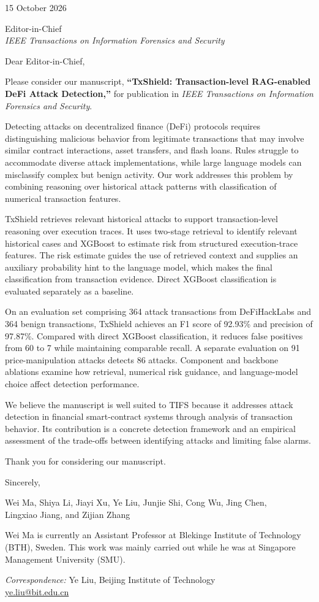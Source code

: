 \documentclass[11pt,letterpaper]{article}
\begin{document}
\begin{flushright}
15 October 2026
\end{flushright}
Editor-in-Chief\\
\textit{IEEE Transactions on Information Forensics and Security}

Dear Editor-in-Chief,

Please consider our manuscript, \textbf{``TxShield: Transaction-level RAG-enabled DeFi Attack Detection,''} for publication in \textit{IEEE Transactions on Information Forensics and Security}.

Detecting attacks on decentralized finance (DeFi) protocols requires distinguishing malicious behavior from legitimate transactions that may involve similar contract interactions, asset transfers, and flash loans. Rules struggle to accommodate diverse attack implementations, while large language models can misclassify complex but benign activity. Our work addresses this problem by combining reasoning over historical attack patterns with classification of numerical transaction features.

TxShield retrieves relevant historical attacks to support transaction-level reasoning over execution traces. It uses two-stage retrieval to identify relevant historical cases and XGBoost to estimate risk from structured execution-trace features. The risk estimate guides the use of retrieved context and supplies an auxiliary probability hint to the language model, which makes the final classification from transaction evidence. Direct XGBoost classification is evaluated separately as a baseline.

On an evaluation set comprising 364 attack transactions from DeFiHackLabs and 364 benign transactions, TxShield achieves an F1 score of 92.93\% and precision of 97.87\%. Compared with direct XGBoost classification, it reduces false positives from 60 to 7 while maintaining comparable recall. A separate evaluation on 91 price-manipulation attacks detects 86 attacks. Component and backbone ablations examine how retrieval, numerical risk guidance, and language-model choice affect detection performance.

We believe the manuscript is well suited to TIFS because it addresses attack detection in financial smart-contract systems through analysis of transaction behavior. Its contribution is a concrete detection framework and an empirical assessment of the trade-offs between identifying attacks and limiting false alarms.

Thank you for considering our manuscript.

Sincerely,

Wei Ma, Shiya Li, Jiayi Xu, Ye Liu, Junjie Shi, Cong Wu, Jing Chen,\\
Lingxiao Jiang, and Zijian Zhang

Wei Ma is currently an Assistant Professor at Blekinge Institute of Technology (BTH), Sweden. This work was mainly carried out while he was at Singapore Management University (SMU).

\textit{Correspondence:} Ye Liu, Beijing Institute of Technology\\
\href{mailto:ye.liu@bit.edu.cn}{ye.liu@bit.edu.cn}
\end{document}
